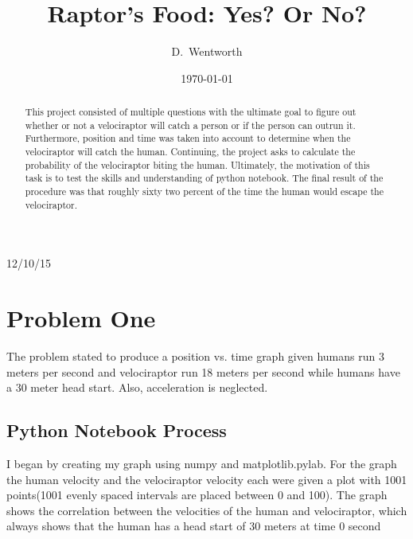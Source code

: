 \documentclass[twocolumn]{revtex4}
\begin{document}
\title{
Raptor's Food: Yes? Or No?
}

\author{D.~Wentworth}

\date{\today}
12/10/15

\begin{abstract}
	This project consisted of multiple questions with the ultimate goal to figure out whether or not a velociraptor will catch a person or if the person can outrun it. Furthermore, position and time was taken into account to determine when the velociraptor will catch the human. Continuing, the project asks to calculate the probability of the velociraptor biting the human. Ultimately, the motivation of this task is to test the skills and understanding of python notebook. The final result of the procedure was that roughly sixty two percent of the time the human would escape the velociraptor.
   \end{abstract}

\maketitle
\section{Problem One}
The problem stated to produce a position vs. time graph given humans run 3 meters per second and velociraptor run 18 meters per second while humans have a 30 meter head start. Also, acceleration is neglected.
\subsection{Python Notebook Process}
I began by creating my graph using numpy and matplotlib.pylab. For the graph the human velocity and the velociraptor velocity each were given a plot with 1001 points(1001 evenly spaced intervals are placed between 0 and 100). The graph shows the correlation between the velocities of the human and velociraptor, which always shows that the human has a head start of 30 meters at time 0 second
\end{document}
